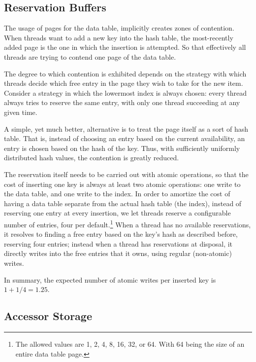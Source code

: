 \subsection{Reservation Buffers}\label{subsec:reservation-buffers}

The usage of pages for the data table, implicitly creates zones of contention.
When threads want to add a new key into the hash table, the most-recently added page is the one in which the insertion is attempted.
So that effectively all threads are trying to contend one page of the data table.

The degree to which contention is exhibited depends on the strategy with which threads decide which free entry in the page they wish to take for the new item.
Consider a strategy in which the lowermost index is always chosen: every thread always tries to reserve the same entry, with only one thread succeeding at any given time.

A simple, yet much better, alternative is to treat the page itself as a sort of hash table.
That is, instead of choosing an entry based on the current availability, an entry is chosen based on the hash of the key.
Thus, with sufficiently uniformly distributed hash values, the contention is greatly reduced.

The reservation itself needs to be carried out with atomic operations, so that the cost of inserting one key is always at least two atomic operations: one write to the data table, and one write to the index.
In order to amortize the cost of having a data table separate from the actual hash table (the index), instead of reserving one entry at every insertion, we let threads reserve a configurable number of entries, four per default.\footnote{%
	The allowed values are 1, 2, 4, 8, 16, 32, or 64.
	With 64 being the size of an entire data table page.
}
When a thread has no available reservations, it resolves to finding a free entry based on the key's hash as described before, reserving four entries; instead when a thread has reservations at disposal, it directly writes into the free entries that it owns, using regular (non-atomic) writes.

In summary, the expected number of atomic writes per inserted key is $1 + 1/4 = 1.25$.


\subsection{Accessor Storage}\label{subsec:accessor-storage}


